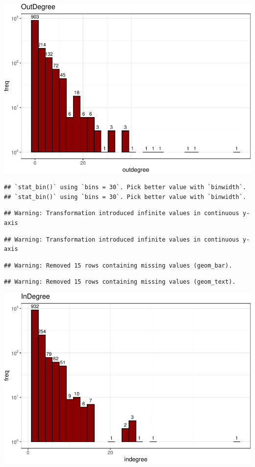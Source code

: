 \documentclass[
]{article}
\begin{document}
\includegraphics{HumanDiseaseNetwork_files/figure-latex/unnamed-chunk-5-1.pdf}

\begin{verbatim}
## `stat_bin()` using `bins = 30`. Pick better value with `binwidth`.
## `stat_bin()` using `bins = 30`. Pick better value with `binwidth`.
\end{verbatim}

\begin{verbatim}
## Warning: Transformation introduced infinite values in continuous y-axis
\end{verbatim}

\begin{verbatim}
## Warning: Transformation introduced infinite values in continuous y-axis
\end{verbatim}

\begin{verbatim}
## Warning: Removed 15 rows containing missing values (geom_bar).
\end{verbatim}

\begin{verbatim}
## Warning: Removed 15 rows containing missing values (geom_text).
\end{verbatim}

\includegraphics{HumanDiseaseNetwork_files/figure-latex/unnamed-chunk-5-2.pdf}
\end{document}
